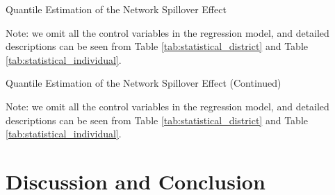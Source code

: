 \documentclass[11pt]{article}
\begin{document}
\begin{table}
  \begin{center}
    \begin{scriptsize}
      \caption{Quantile Estimation of the Network Spillover Effect}
      \label{tab:quantile_estimate_network_1}
      
    
    Note: we omit all the control variables in the regression model, and detailed descriptions can be seen from Table \ref{tab:statistical_district} and Table \ref{tab:statistical_individual}.
    \end{scriptsize}
  \end{center}
\end{table}

\begin{table}
  \begin{center}
    \begin{scriptsize}
      \caption{Quantile Estimation of the Network Spillover Effect (Continued)}
      \label{tab:quantile_estimate_network_2}
      
    
    Note: we omit all the control variables in the regression model, and detailed descriptions can be seen from Table \ref{tab:statistical_district} and Table \ref{tab:statistical_individual}.
    \end{scriptsize}
  \end{center}
\end{table}

\section{Discussion and Conclusion} \label{sec:conclusion}
\end{document}
